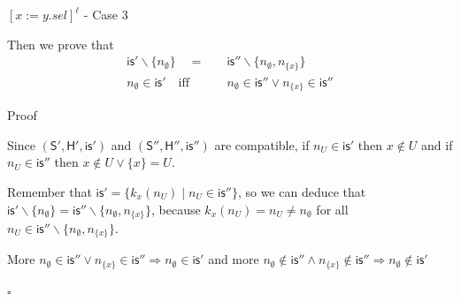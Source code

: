 \documentclass[xcolor=svgnames,11pt]{beamer}
\begin{document}
\begin{frame}{$[x:=y.sel]^\ell$ - Case 3}

Then we prove that
\begin{align*}
\mathsf{is'} \backslash \{ n_\emptyset \} \quad=&\quad \mathsf{is''} \backslash \{ n_\emptyset, n_{\{ x \}} \} \\
n_\emptyset \in \mathsf{is'} \quad\mathrm{iff}&\quad n_\emptyset \in \mathsf{is''} \vee n_{\{ x \}} \in \mathsf{is''}
\end{align*} 

\medskip
\pause

\begin{block}{Proof}
\begin{footnotesize}
Since $\mathsf{(S',H',is')}$ and $\mathsf{(S'',H'',is'')}$ are compatible, if $n_U \in \mathsf{is'}$ then $x \not\in U$ and if $n_U \in \mathsf{is''}$ then $x \not\in U \vee \{ x \} = U$.\\

\medskip

Remember that $\mathsf{is'} = \{ k_x(n_U) \;|\; n_U \in \mathsf{is''} \} $, so we can deduce that $\mathsf{is'} \backslash \{ n_\emptyset \} = \mathsf{is''} \backslash \{n_\emptyset, n_{\{x\}} \}$, because $k_x(n_U) = n_U \neq n_\emptyset$ for all $n_U \in \mathsf{is''} \backslash \{n_\emptyset, n_{\{x\}} \}$.\\

\medskip

More $n_\emptyset \in \mathsf{is''} \vee n_{\{x\}} \in \mathsf{is''} \Rightarrow n_\emptyset \in \mathsf{is'}$ and more $n_\emptyset \not\in \mathsf{is''} \wedge n_{\{x\}} \not\in \mathsf{is''} \Rightarrow n_\emptyset \not\in \mathsf{is'}$

\begin{flushright}
$\square$
\end{flushright}
\end{footnotesize}
\end{block}

\end{frame}
\end{document}
